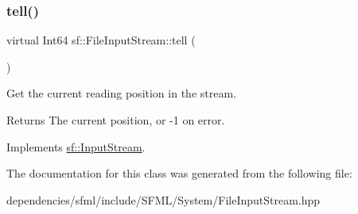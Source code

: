 \subsubsection{\texorpdfstring{tell()}{tell()}}
{\footnotesize\ttfamily virtual Int64 sf\+::\+File\+Input\+Stream\+::tell (\begin{DoxyParamCaption}{ }\end{DoxyParamCaption})\hspace{0.3cm}{\ttfamily [virtual]}}



Get the current reading position in the stream. 

\begin{DoxyReturn}{Returns}
The current position, or -\/1 on error. 
\end{DoxyReturn}


Implements \hyperlink{classsf_1_1_input_stream_a599515b9ccdbddb6fef5a98424fd559c}{sf\+::\+Input\+Stream}.



The documentation for this class was generated from the following file\+:\begin{DoxyCompactItemize}
\item 
dependencies/sfml/include/\+S\+F\+M\+L/\+System/File\+Input\+Stream.\+hpp\end{DoxyCompactItemize}

